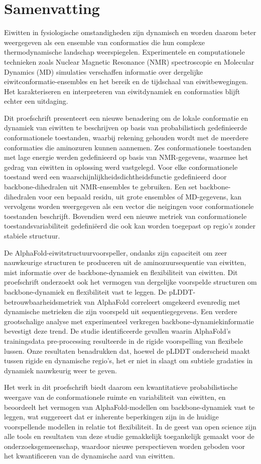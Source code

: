 \chapter*{Samenvatting}

Eiwitten in fysiologische omstandigheden zijn dynamisch en worden daarom beter weergegeven als een ensemble van conformaties die hun complexe thermodynamische landschap weerspiegelen. Experimentele en computationele technieken zoals Nuclear Magnetic Resonance (NMR) spectroscopie en Molecular Dynamics (MD) simulaties verschaffen informatie over dergelijke eiwitconformatie-ensembles en het bereik en de tijdschaal van eiwitbewegingen. Het karakteriseren en interpreteren van eiwitdynamiek en conformaties blijft echter een uitdaging.

Dit proefschrift presenteert een nieuwe benadering om de lokale conformatie en dynamiek van eiwitten te beschrijven op basis van probabilistisch gedefinieerde conformationele toestanden, waarbij rekening gehouden wordt met de meerdere conformaties die aminozuren kunnen aannemen. Zes conformationele toestanden met lage energie werden gedefinieerd op basis van NMR-gegevens, waarmee het gedrag van eiwitten in oplossing werd vastgelegd. Voor elke conformationele toestand werd een waarschijnlijkheidsdichtheidsfunctie gedefinieerd door backbone-dihedralen uit NMR-ensembles te gebruiken. Een set backbone-dihedralen voor een bepaald residu, uit grote ensembles of MD-gegevens, kan vervolgens worden weergegeven als een vector die neigingen voor conformationele toestanden beschrijft. Bovendien werd een nieuwe metriek van conformationele toestandsvariabiliteit gedefiniëerd die ook kan worden toegepast op regio's zonder stabiele structuur.

De AlphaFold-eiwitstructuurvoorspeller, ondanks zijn capaciteit om zeer nauwkeurige structuren te produceren uit de aminozuursequentie van eiwitten, mist informatie over de backbone-dynamiek en flexibiliteit van eiwitten. Dit proefschrift onderzoekt ook het vermogen van dergelijke voorspelde structuren om backbone-dynamiek en flexibiliteit vast te leggen. De pLDDT-betrouwbaarheidsmetriek van AlphaFold correleert omgekeerd evenredig met dynamische metrieken die zijn voorspeld uit sequentiegegevens. Een verdere grootschalige analyse met experimenteel verkregen backbone-dynamiekinformatie bevestigt deze trend. De studie identificeerde gevallen waarin AlphaFold's trainingsdata pre-processing resulteerde in de rigide voorspelling van flexibele lussen. Onze resultaten benadrukken dat, hoewel de pLDDT onderscheid maakt tussen rigide en dynamische regio's, het er niet in slaagt om subtiele gradaties in dynamiek nauwkeurig weer te geven.

Het werk in dit proefschrift biedt daarom een kwantitatieve probabilistische weergave van de conformationele ruimte en variabiliteit van eiwitten, en beoordeelt het vermogen van AlphaFold-modellen om backbone-dynamiek vast te leggen, wat suggereert dat er inherente beperkingen zijn in de huidige voorspellende modellen in relatie tot flexibiliteit. In de geest van open science zijn alle tools en resultaten van deze studie gemakkelijk toegankelijk gemaakt voor de onderzoeksgemeenschap, waardoor nieuwe perspectieven worden geboden voor het kwantificeren van de dynamische aard van eiwitten.